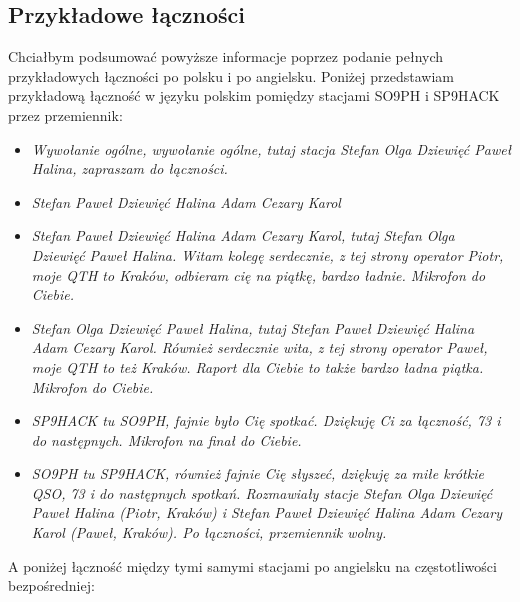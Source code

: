 \documentclass[a4paper,11pt]{article}
\begin{document}
\subsection{Przykładowe łączności}
Chciałbym podsumować powyższe informacje poprzez podanie pełnych przykładowych łączności po polsku i po angielsku. Poniżej przedstawiam przykładową łączność w języku polskim pomiędzy stacjami SO9PH i SP9HACK przez przemiennik:
\begin{itemize}
\item \textit{Wywołanie ogólne, wywołanie ogólne, tutaj stacja Stefan Olga Dziewięć Paweł Halina, zapraszam do łączności.}
\item \textit{Stefan Paweł Dziewięć Halina Adam Cezary Karol}
\item \textit{Stefan Paweł Dziewięć Halina Adam Cezary Karol, tutaj Stefan Olga Dziewięć Paweł Halina. Witam kolegę serdecznie, z tej strony operator Piotr, moje QTH to Kraków, odbieram cię na piątkę, bardzo ładnie. Mikrofon do Ciebie.}
\item \textit{Stefan Olga Dziewięć Paweł Halina, tutaj Stefan Paweł Dziewięć Halina Adam Cezary Karol. Również serdecznie wita, z tej strony operator Paweł, moje QTH to też Kraków. Raport dla Ciebie to także bardzo ładna piątka. Mikrofon do Ciebie.}
\item \textit{SP9HACK tu SO9PH, fajnie było Cię spotkać. Dziękuję Ci za łączność, 73 i do następnych. Mikrofon na finał do Ciebie.}
\item \textit{SO9PH tu SP9HACK, również fajnie Cię słyszeć, dziękuję za miłe krótkie QSO, 73 i do następnych spotkań. Rozmawiały stacje Stefan Olga Dziewięć Paweł Halina (Piotr, Kraków) i Stefan Paweł Dziewięć Halina Adam Cezary Karol (Paweł, Kraków). Po łączności, przemiennik wolny.}
\end{itemize}
A poniżej łączność między tymi samymi stacjami po angielsku na częstotliwości bezpośredniej:
\end{document}
